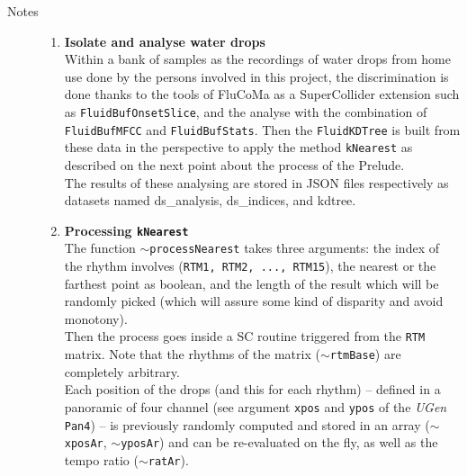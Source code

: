 \begin{description}
\item[Notes] \hfill 
\begin{enumerate}[label=\alph*)]
\item \textbf{Isolate and analyse water drops}\\ 
Within a bank of samples as the recordings of water drops from home use done by the persons involved in this project, the discrimination is done thanks to the tools of FluCoMa as a SuperCollider extension such as \texttt{FluidBufOnsetSlice}, and the analyse with the combination of  \texttt{FluidBufMFCC} and  \texttt{FluidBufStats}. Then the  \texttt{FluidKDTree} is built from these data in the perspective to apply the method  \texttt{kNearest} as described on the next point about the process of the Prelude.\\ 
The results of these analysing are stored in JSON files respectively as datasets named \textsf{ds\_analysis},  \textsf{ds\_indices}, and \textsf{kdtree}.
\item \textbf{Processing \texttt{kNearest}}\\ 
The function \texttt{$\sim$processNearest} takes three arguments: the index of the rhythm involves (\texttt{RTM1, RTM2, ..., RTM15}), the nearest or the farthest point as boolean, and the length of the result which will be randomly picked (which will assure some kind of disparity and avoid monotony).\\ 
 Then the process goes inside a SC routine triggered from the \texttt{RTM} matrix. Note that the rhythms of the matrix (\texttt{$\sim$rtmBase}) are completely arbitrary.\\ 
 Each position of the drops (and this for each rhythm) -- defined in a panoramic of four channel (see argument \texttt{xpos} and \texttt{ypos} of the \textit{UGen} \texttt{Pan4}) -- is previously randomly computed and stored in an array (\texttt{$\sim$xposAr}, \texttt{$\sim$yposAr}) and can be re-evaluated on the fly, as well as the tempo ratio (\texttt{$\sim$ratAr}).
\end{enumerate}

\end{description}

